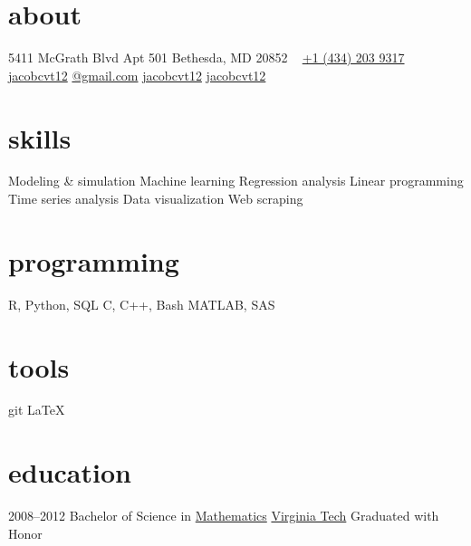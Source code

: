 \documentclass[]{friggeri-cv} %
\begin{document}



\begin{aside} %
\section{about}
5411 McGrath Blvd
Apt 501
Bethesda, MD 20852
~
\href{tel:14342039317}{\faPhone +1 (434) 203 9317}
\href{mailto:jacobcvt12@gmail.com}{\faEnvelope jacobcvt12}
\href{mailto:jacobcvt12@gmail.com}{@gmail.com}
\href{https://github.com/jacobcvt12}{\faGithub jacobcvt12}
\href{https://www.linkedin.com/in/jacobcvt12}{\faLinkedin jacobcvt12}
\section{skills}
Modeling \& simulation
Machine learning
Regression analysis
Linear programming
Time series analysis
Data visualization
Web scraping
\section{programming}
R, Python, SQL
C, C++, Bash
MATLAB, SAS
\section{tools}
git
\LaTeX
\end{aside}


\section{education}

\begin{entrylist}
\entry
{2008--2012}
{Bachelor {\normalfont of Science in}
\href{https://www.math.vt.edu/}{Mathematics}}
{\href{http://www.vt.edu}{Virginia Tech}}
{Graduated with Honor}
\end{entrylist}
\end{document}
